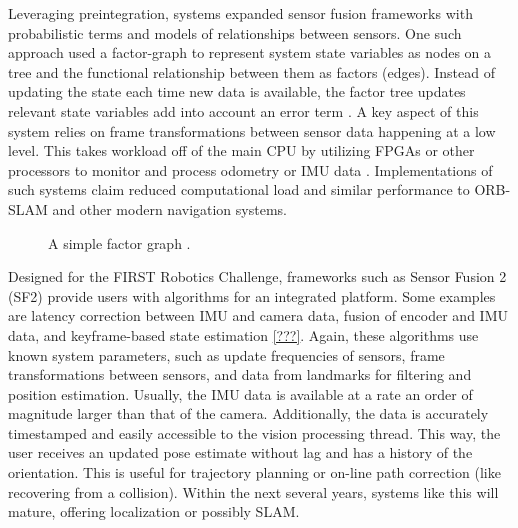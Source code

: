 \documentclass{article}
\begin{document}
        Leveraging preintegration, systems expanded sensor fusion frameworks with probabilistic terms and models of relationships between sensors. One such approach used a factor-graph to represent system state variables as nodes on a tree and the functional relationship between them as factors (edges). Instead of updating the state each time new data is available, the factor tree updates relevant state variables add into account an error term \cite{indelman_ifns_2013}. A key aspect of this system relies on frame transformations between sensor data happening at a low level. This takes workload off of the main CPU by utilizing FPGAs or other processors to monitor and process odometry or IMU data \cite{li_gyro_2017}. Implementations of such systems claim reduced computational load and similar performance to ORB-SLAM and other modern navigation systems.

    \begin{figure}[H]
      \centering
      \label{fig:ex_factor_graph}
      \caption{A simple factor graph \cite{hwymeers_example}.}
    \end{figure}

      Designed for the FIRST Robotics Challenge, frameworks such as Sensor Fusion 2 (SF2) provide users with algorithms for an integrated platform. Some examples are latency correction between IMU and camera data, fusion of encoder and IMU data, and keyframe-based state estimation \ref{???}. Again, these algorithms use known system parameters, such as update frequencies of sensors, frame transformations between sensors, and data from landmarks for filtering and position estimation. Usually, the IMU data is available at a rate an order of magnitude larger than that of the camera. Additionally, the data is accurately timestamped and easily accessible to the vision processing thread. This way, the user receives an updated pose estimate without lag and has a history of the orientation. This is useful for trajectory planning or on-line path correction (like recovering from a collision). Within the next several years, systems like this will mature, offering localization or possibly SLAM.
\end{document}
